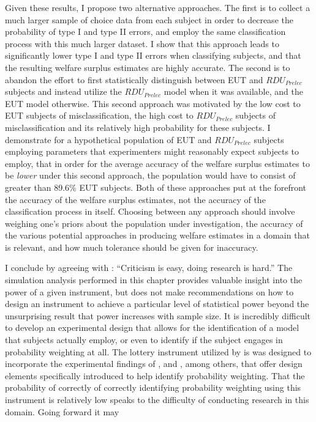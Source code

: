 \documentclass[../main.tex]{subfiles}
\begin{document}
Given these results, I propose two alternative approaches.
The first is to collect a much larger sample of choice data from each subject in order to decrease the probability of type I and type II errors, and employ the same classification process with this much larger dataset.
I show that this approach leads to significantly lower type I and type II errors when classifying subjects, and that the resulting welfare surplus estimates are highly accurate.
The second is to abandon the effort to first statistically distinguish between EUT and $\mathit{RDU_{Prelec}}$ subjects and instead utilize the $\mathit{RDU_{Prelec}}$ model when it was available, and the EUT model otherwise.
This second approach was motivated by the low cost to EUT subjects of misclassification, the high cost to $\mathit{RDU_{Prelec}}$ subjects of misclassification and its relatively high probability for these subjects.
I demonstrate for a hypothetical population of EUT and $\mathit{RDU_{Prelec}}$ subjects employing parameters that experimenters might reasonably expect subjects to employ, that in order for the average accuracy of the welfare surplus estimates to be \textit{lower} under this second approach, the population would have to consist of greater than 89.6\% EUT subjects.
Both of these approaches put at the forefront the accuracy of the welfare surplus estimates, not the accuracy of the classification process in itself.
Choosing between any approach should involve weighing one's priors about the population under investigation, the accuracy of the various potential approaches in producing welfare estimates in a domain that is relevant, and how much tolerance should be given for inaccuracy.

I conclude by agreeing with \textcite[14]{Gelman2013}: \enquote{Criticism is easy, doing research is hard.}
The simulation analysis performed in this chapter provides valuable insight into the power of a given instrument, but does not make recommendations on how to design an instrument to achieve a particular level of statistical power beyond the unsurprising result that power increases with sample size.
It is incredibly difficult to develop an experimental design that allows for the identification of a model that subjects actually employ, or even to identify if the subject engages in probability weighting at all.
The lottery instrument utilized by \textcite[98-99]{Harrison2016} is was designed to incorporate the experimental findings of \textcite{Camerer1989}, \textcite{Harless1992} and \textcite{Loomes1998}, among others, that offer design elements specifically introduced to help identify probability weighting.
That the probability of correctly of correctly identifying probability weighting using this instrument is relatively low speaks to the difficulty of conducting research in this domain.
Going forward it may 
\end{document}
